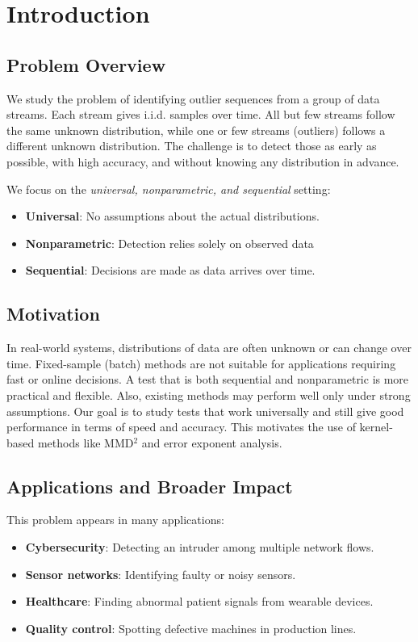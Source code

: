 \chapter{Introduction}

\section{Problem Overview}

We study the problem of identifying outlier sequences from a group of data streams. Each stream gives i.i.d. samples over time. All but few streams follow the same unknown distribution, while one or few streams (outliers) follows a different unknown distribution. The challenge is to detect those as early as possible, with high accuracy, and without knowing any distribution in advance.

We focus on the \textit{universal, nonparametric, and sequential} setting:
\begin{itemize}
    \item \textbf{Universal}: No assumptions about the actual distributions.
    \item \textbf{Nonparametric}: Detection relies solely on observed data
    \item \textbf{Sequential}: Decisions are made as data arrives over time.
\end{itemize}

\section{Motivation}

In real-world systems, distributions of data are often unknown or can change over time. Fixed-sample (batch) methods are not suitable for applications requiring fast or online decisions. A test that is both sequential and nonparametric is more practical and flexible. Also, existing methods may perform well only under strong assumptions. Our goal is to study tests that work universally and still give good performance in terms of speed and accuracy. This motivates the use of kernel-based methods like MMD$^2$ and error exponent analysis.

\section{Applications and Broader Impact}

This problem appears in many applications:
\begin{itemize}
    \item \textbf{Cybersecurity}: Detecting an intruder among multiple network flows.
    \item \textbf{Sensor networks}: Identifying faulty or noisy sensors.
    \item \textbf{Healthcare}: Finding abnormal patient signals from wearable devices.
    \item \textbf{Quality control}: Spotting defective machines in production lines.
\end{itemize}

